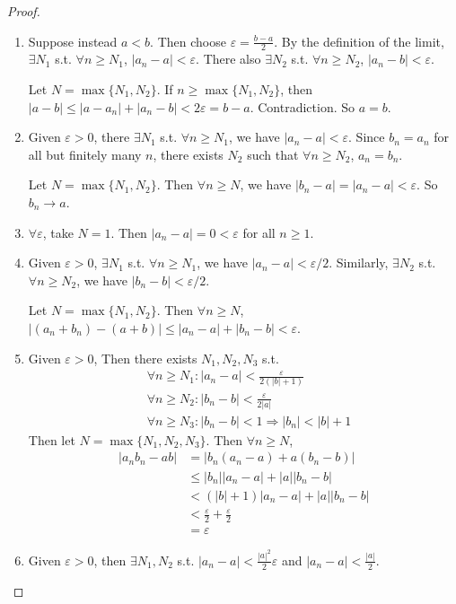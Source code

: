 \documentclass[a4paper]{article}
\begin{document}
\begin{proof}\leavevmode
  \begin{enumerate}
    \item Suppose instead $a < b$. Then choose $\varepsilon = \frac{b - a}{2}$. By the definition of the limit, $\exists N_1$ s.t. $\forall n\geq N_1$, $|a_n - a| < \varepsilon$. There also $\exists N_2$ s.t. $\forall n\geq N_2$, $|a_n - b| < \varepsilon$.

      Let $N = \max\{N_1, N_2\}$. If $n\geq \max\{N_1, N_2\}$, then $|a - b| \leq |a - a_n| + |a_n - b| < 2\varepsilon = b - a.$
      Contradiction. So $a = b$.
    \item Given $\varepsilon > 0$, there $\exists N_1$ s.t. $\forall n\geq N_1$, we have $|a_n - a| < \varepsilon$. Since $b_n = a_n$ for all but finitely many $n$, there exists $N_2$ such that $\forall n\geq N_2$, $a_n = b_n$.

      Let $N = \max\{N_1, N_2\}$. Then $\forall n\geq N$, we have $|b_n - a| = |a_n - a| < \varepsilon$. So $b_n\to a$.
    \item $\forall \varepsilon$, take $N = 1$. Then $|a_n - a| = 0 < \varepsilon$ for all $n \geq 1$.
    \item Given $\varepsilon > 0$, $\exists N_1$ s.t. $\forall n\geq N_1$, we have $|a_n - a| < \varepsilon/2$. Similarly, $\exists N_2$ s.t. $\forall n\geq N_2$, we have $|b_n - b| < \varepsilon/2$.

      Let $N = \max\{N_1, N_2\}$. Then $\forall n \geq N$, $|(a_n + b_n) - (a + b)| \leq |a_n - a| + |b_n - b| < \varepsilon$.
    \item Given $\varepsilon > 0$, Then there exists $N_1, N_2, N_3$ s.t.
      \begin{align*}
        &\forall n\geq N_1: |a_n - a| < \frac{\varepsilon}{2(|b| + 1)}\\
        &\forall n\geq N_2: |b_n - b| < \frac{\varepsilon}{2|a|}\\
        &\forall n\geq N_3: |b_n - b| < 1 \Rightarrow |b_n| < |b| +1
      \end{align*}
      Then let $N = \max\{N_1, N_2, N_3\}$. Then $\forall n\geq N$,
      \begin{align*}
        |a_nb_n - ab| &= |b_n(a_n - a) + a(b_n - b)|\\
        &\leq |b_n| |a_n - a| + |a||b_n - b|\\
        &< (|b| + 1) |a_n - a| + |a||b_n - b|\\
        &< \frac{\varepsilon}{2} + \frac{\varepsilon}{2}\\
        &= \varepsilon
      \end{align*}
    \item Given $\varepsilon > 0$, then $\exists N_1, N_2$ s.t. $|a_n - a| < \frac{|a|^2}{2}\varepsilon$ and $|a_n - a| < \frac{|a|}{2}$.


\end{enumerate}
\end{proof}
\end{document}
